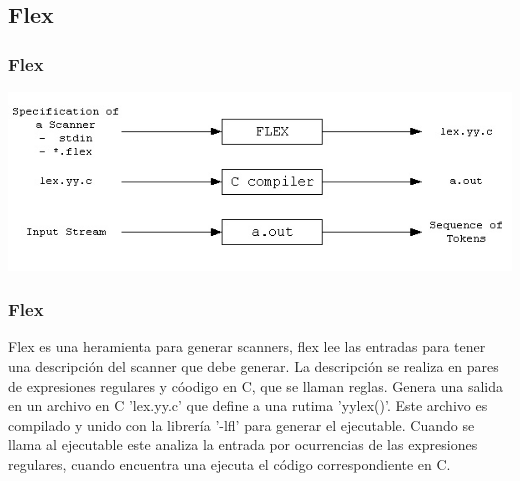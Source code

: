 \documentclass{beamer}
\begin{document}
\subsection{Flex}\begin{frame} 
\frametitle{Flex} 
 
\includegraphics[width=\textwidth]{flex}\end{frame} 
\begin{frame}[allowframebreaks] 
\frametitle{Flex} 
 
Flex es una heramienta para generar scanners, flex lee las entradas para tener una descripción del scanner que debe generar. La descripción se realiza en pares de expresiones regulares y cóodigo en C, que se llaman reglas. Genera una salida en un archivo en C 'lex.yy.c' que define a una rutima 'yylex()'. Este archivo es compilado y unido con la librería '-lfl' para generar el ejecutable. Cuando se llama al ejecutable este analiza la entrada por ocurrencias de las expresiones regulares, cuando encuentra una ejecuta el código correspondiente en C.\end{frame} 
\end{document}

